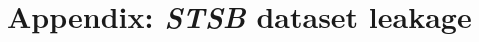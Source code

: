 \documentclass[14pt, twocolumn]{article}
\begin{document}
\newpage
\section{Appendix: \textit{STSB} dataset leakage}

\end{document}
